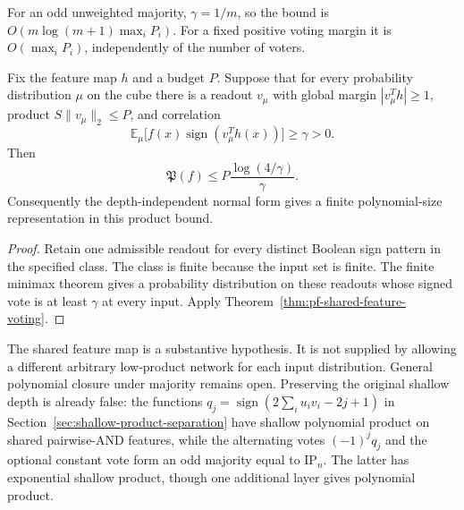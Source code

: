 For an odd unweighted majority, $\gamma=1/m$, so the bound is
$O(m\log(m+1)\max_iP_i)$. For a fixed positive voting margin it is
$O(\max_iP_i)$, independently of the number of voters.

\begin{corollary}
\label{cor:pf-shared-feature-minimax}
Fix the feature map $h$ and a budget $P$. Suppose that for every
probability distribution $\mu$ on the cube there is a readout $v_\mu$
with global margin $|v_\mu^Th|\ge1$, product
$S\|v_\mu\|_2\le P$, and correlation
\[
 \mathbb E_\mu\bigl[f(x)\operatorname{sign}(v_\mu^Th(x))\bigr]
 \ge\gamma>0.
\]
Then
\[
 \mathfrak P(f)\le P\frac{\log(4/\gamma)}{\gamma}.
\]
Consequently the depth-independent normal form gives a finite
polynomial-size representation in this product bound.
\end{corollary}

\begin{proof}
Retain one admissible readout for every distinct Boolean sign pattern
in the specified class. The class is finite because the input set is
finite. The finite minimax theorem gives a probability distribution on
these readouts whose signed vote is at least $\gamma$ at every input.
Apply Theorem~\ref{thm:pf-shared-feature-voting}.
\end{proof}

The shared feature map is a substantive hypothesis. It is not supplied
by allowing a different arbitrary low-product network for each input
distribution. General polynomial closure under majority remains open.
Preserving the original shallow depth is already false: the functions
$q_j=\operatorname{sign}(2\sum_i u_iv_i-2j+1)$ in
Section~\ref{sec:shallow-product-separation} have shallow polynomial
product on shared pairwise-AND features, while the alternating votes
$(-1)^jq_j$ and the optional constant vote form an odd majority equal
to $\mathrm{IP}_n$. The latter has exponential shallow product, though
one additional layer gives polynomial product.
